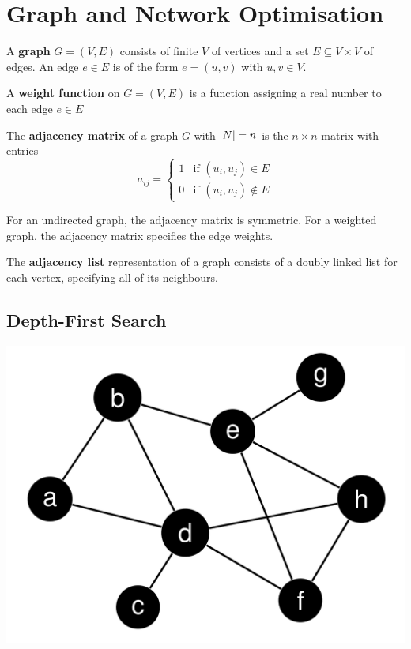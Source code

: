 \documentclass[11pt]{article}
\DeclarePairedDelimiter\abs{\lvert}{\rvert}
\begin{document}
\section{Graph and Network Optimisation}

\begin{theorem}
	A \textbf{graph} $G=(V,E)$ consists of finite $V$ of vertices and a set $E\subseteq V\times V$ of edges. An edge $e \in E$ is of the form $e = (u,v)$ with $u,v\in V$.
	
	A \textbf{weight function} on $G=(V,E)$ is a function assigning a real number to each edge $e\in E$
\end{theorem}

\begin{theorem}
	The \textbf{adjacency matrix} of a graph $G$ with $\abs{N} = n$ is the $n\times n$-matrix with entries
	\begin{equation*}
		a_{ij} = \left\{\begin{matrix}
		1 & \text{if } (u_i, u_j) \in E\\
		0 & \text{if } (u_i, u_j) \notin E
		\end{matrix}
		\right.
	\end{equation*}
\end{theorem}
For an undirected graph, the adjacency matrix is symmetric. For a weighted graph, the adjacency matrix specifies the edge weights.

The \textbf{adjacency list} representation of a graph consists of a doubly linked list for each vertex, specifying all of its neighbours.

\subsection{Depth-First Search}

\begin{center}
	\includegraphics[width=0.6\linewidth]{search_graph_example}
\end{center}
\end{document}
